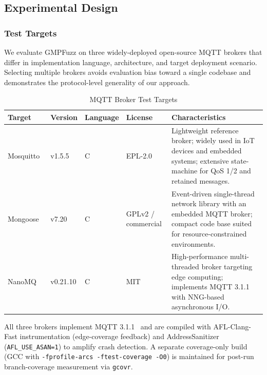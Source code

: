 \subsection{Experimental Design}
\label{subsec:exp-design}

\subsubsection{Test Targets}
\label{subsubsec:targets}

We evaluate GMPFuzz on three widely-deployed open-source MQTT brokers that
differ in implementation language, architecture, and target deployment
scenario.  Selecting multiple brokers avoids evaluation bias toward a single
codebase and demonstrates the protocol-level generality of our approach.

\begin{table}[htbp]
  \centering
  \caption{MQTT Broker Test Targets}
  \label{tab:targets}
  \renewcommand{\arraystretch}{1.25}
  \begin{tabular}{llllp{4.2cm}}
    \toprule
    \textbf{Target} & \textbf{Version} & \textbf{Language} & \textbf{License} &
    \textbf{Characteristics} \\
    \midrule
    Mosquitto~\cite{mosquitto}
      & v1.5.5
      & C
      & EPL-2.0
      & Lightweight reference broker; widely used in IoT devices and embedded
        systems; extensive state-machine for QoS 1/2 and retained messages. \\
    \addlinespace
    Mongoose~\cite{mongoose}
      & v7.20
      & C
      & GPLv2 / commercial
      & Event-driven single-thread network library with an embedded MQTT broker;
        compact code base suited for resource-constrained environments. \\
    \addlinespace
    NanoMQ~\cite{nanomq}
      & v0.21.10
      & C
      & MIT
      & High-performance multi-threaded broker targeting edge computing;
        implements MQTT 3.1.1 with NNG-based asynchronous I/O. \\
    \bottomrule
  \end{tabular}
\end{table}

All three brokers implement MQTT 3.1.1~\cite{mqtt311spec} and are compiled
with AFL-Clang-Fast instrumentation (edge-coverage feedback) and AddressSanitizer
(\texttt{AFL\_USE\_ASAN=1}) to amplify crash detection.  A separate
coverage-only build (GCC with \texttt{-fprofile-arcs -ftest-coverage -O0}) is
maintained for post-run branch-coverage measurement via \texttt{gcovr}.

